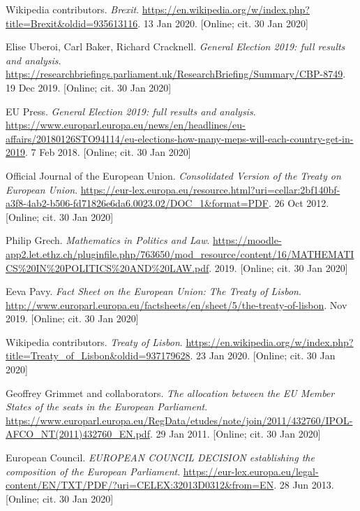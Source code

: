 \documentclass[a4paper]{article}
\theoremstyle{definition}
\begin{document}
\begin{thebibliography}{9}
	
	Wikipedia contributors. \textit{Brexit}. \url{https://en.wikipedia.org/w/index.php?title=Brexit&oldid=935613116}. 13 Jan 2020. [Online; cit. 30 Jan 2020]
	
    Elise Uberoi, Carl Baker, Richard Cracknell. \textit{General Election 2019: full results and analysis}. \url{https://researchbriefings.parliament.uk/ResearchBriefing/Summary/CBP-8749}. 19 Dec 2019. [Online; cit. 30 Jan 2020]
    
    EU Press. \textit{General Election 2019: full results and analysis}. \url{https://www.europarl.europa.eu/news/en/headlines/eu-affairs/20180126STO94114/eu-elections-how-many-meps-will-each-country-get-in-2019}. 7 Feb 2018. [Online; cit. 30 Jan 2020]
    
    Official Journal of the European Union. \textit{Consolidated Version of the Treaty on European Union}. \url{https://eur-lex.europa.eu/resource.html?uri=cellar:2bf140bf-a3f8-4ab2-b506-fd71826e6da6.0023.02/DOC_1&format=PDF}. 26 Oct 2012. [Online; cit. 30 Jan 2020]
    
    Philip Grech. \textit{Mathematics in Politics and Law}. \url{https://moodle-app2.let.ethz.ch/pluginfile.php/763650/mod_resource/content/16/MATHEMATICS%20IN%20POLITICS%20AND%20LAW.pdf}. 2019. [Online; cit. 30 Jan 2020]
    	
    Eeva Pavy. \textit{Fact Sheet on the European Union: The Treaty of Lisbon}. \url{http://www.europarl.europa.eu/factsheets/en/sheet/5/the-treaty-of-lisbon}. Nov 2019. [Online; cit. 30 Jan 2020]
    
    Wikipedia contributors. \textit{Treaty of Lisbon}. \url{https://en.wikipedia.org/w/index.php?title=Treaty_of_Lisbon&oldid=937179628}. 23 Jan 2020. [Online; cit. 30 Jan 2020]
    
    Geoffrey Grimmet and collaborators. \textit{The allocation between the EU Member States of the seats in the European Parliament}. \url{https://www.europarl.europa.eu/RegData/etudes/note/join/2011/432760/IPOL-AFCO_NT(2011)432760_EN.pdf}. 29 Jan 2011. [Online; cit. 30 Jan 2020]
    
    European Council. \textit{EUROPEAN COUNCIL DECISION establishing the composition of the European Parliament}. \url{https://eur-lex.europa.eu/legal-content/EN/TXT/PDF/?uri=CELEX:32013D0312&from=EN}. 28 Jun 2013. [Online; cit. 30 Jan 2020]
    

\end{thebibliography}
\end{document}
